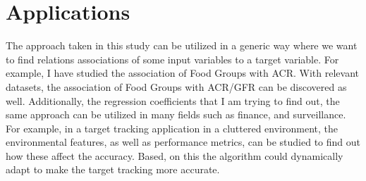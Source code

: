 \section{Applications}
\flushleft \justifying The approach taken in this study can be utilized in a generic way where we want to find relations associations of some input variables to a target variable. For example, I have studied the association of Food Groups with ACR. With relevant datasets, the association of Food Groups with ACR/GFR can be discovered as well. Additionally, the regression coefficients that I am trying to find out, the same approach can be utilized in many fields such as finance, and surveillance. For example, in a target tracking application in a cluttered environment, the environmental features, as well as performance metrics, can be studied to find out how these affect the accuracy. Based, on this the algorithm could dynamically adapt to make the target tracking more accurate.



